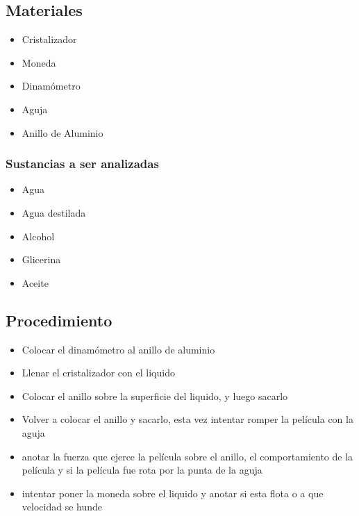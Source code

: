 \documentclass[11pt, letterpaper]{article}
\begin{document}
\subsection{Materiales}
\begin{itemize}
	\item Cristalizador
	\item Moneda
	\item Dinamómetro
	\item Aguja
	\item Anillo de Aluminio
\end{itemize}
\subsubsection{Sustancias a ser analizadas}
\begin{itemize}
	\item Agua
	\item Agua destilada
	\item Alcohol
	\item Glicerina
	\item Aceite
\end{itemize}
\subsection{Procedimiento}
\begin{itemize}
	\item Colocar el dinamómetro al anillo de aluminio
	\item Llenar el cristalizador con el liquido
	\item Colocar el anillo sobre la superficie del liquido, y luego sacarlo
	\item Volver a colocar el anillo y sacarlo, esta vez intentar romper la película con la aguja
	\item anotar la fuerza que ejerce la película sobre el anillo, el comportamiento de la película y si la película fue rota por la punta de la aguja
	\item intentar poner la moneda sobre el liquido y anotar si esta flota o a que velocidad se hunde
\end{itemize}
\end{document}
